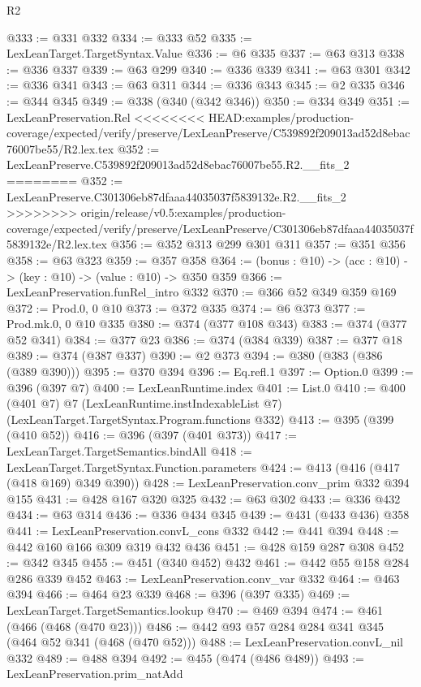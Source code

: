 \begin{lexlean}{R2}
\begin{coremodule}
{{{{{{{{{{{{{{{{{{{{{{@333 := @331 @332
@334 := @333 @52
@335 := LexLeanTarget.TargetSyntax.Value
@336 := @6 @335
@337 := @63 @313
@338 := @336 @337
@339 := @63 @299
@340 := @336 @339
@341 := @63 @301
@342 := @336 @341
@343 := @63 @311
@344 := @336 @343
@345 := @2 @335
@346 := @344 @345
@349 := @338 (@340 (@342 @346))
@350 := @334 @349
@351 := LexLeanPreservation.Rel
<<<<<<<< HEAD:examples/production-coverage/expected/verify/preserve/LexLeanPreserve/C539892f209013ad52d8ebac76007be55/R2.lex.tex
@352 := LexLeanPreserve.C539892f209013ad52d8ebac76007be55.R2.__fits_2
========
@352 := LexLeanPreserve.C301306eb87dfaaa44035037f5839132e.R2.__fits_2
>>>>>>>> origin/release/v0.5:examples/production-coverage/expected/verify/preserve/LexLeanPreserve/C301306eb87dfaaa44035037f5839132e/R2.lex.tex
@356 := @352 @313 @299 @301 @311
@357 := @351 @356
@358 := @63 @323
@359 := @357 @358
@364 := (bonus : @10) -> (acc : @10) -> (key : @10) -> (value : @10) -> @350 @359
@366 := LexLeanPreservation.funRel_intro @332
@370 := @366 @52 @349 @359 @169
@372 := Prod.{0, 0} @10
@373 := @372 @335
@374 := @6 @373
@377 := Prod.mk.{0, 0} @10 @335
@380 := @374 (@377 @108 @343)
@383 := @374 (@377 @52 @341)
@384 := @377 @23
@386 := @374 (@384 @339)
@387 := @377 @18
@389 := @374 (@387 @337)
@390 := @2 @373
@394 := @380 (@383 (@386 (@389 @390)))
@395 := @370 @394
@396 := Eq.refl.{1}
@397 := Option.{0}
@399 := @396 (@397 @7)
@400 := LexLeanRuntime.index
@401 := List.{0}
@410 := @400
    (@401 @7)
    @7
    (LexLeanRuntime.instIndexableList @7)
    (LexLeanTarget.TargetSyntax.Program.functions @332)
@413 := @395 (@399 (@410 @52))
@416 := @396 (@397 (@401 @373))
@417 := LexLeanTarget.TargetSemantics.bindAll
@418 := LexLeanTarget.TargetSyntax.Function.parameters
@424 := @413 (@416 (@417 (@418 @169) @349 @390))
@428 := LexLeanPreservation.conv_prim @332 @394 @155
@431 := @428 @167 @320 @325
@432 := @63 @302
@433 := @336 @432
@434 := @63 @314
@436 := @336 @434 @345
@439 := @431 (@433 @436) @358
@441 := LexLeanPreservation.convL_cons @332
@442 := @441 @394
@448 := @442 @160 @166 @309 @319 @432 @436
@451 := @428 @159 @287 @308
@452 := @342 @345
@455 := @451 (@340 @452) @432
@461 := @442 @55 @158 @284 @286 @339 @452
@463 := LexLeanPreservation.conv_var @332
@464 := @463 @394
@466 := @464 @23 @339
@468 := @396 (@397 @335)
@469 := LexLeanTarget.TargetSemantics.lookup
@470 := @469 @394
@474 := @461 (@466 (@468 (@470 @23)))
@486 := @442 @93 @57 @284 @284 @341 @345 (@464 @52 @341 (@468 (@470 @52)))
@488 := LexLeanPreservation.convL_nil @332
@489 := @488 @394
@492 := @455 (@474 (@486 @489))
@493 := LexLeanPreservation.prim_natAdd
}}}}}}}}}}}}}}}}}}}}}}
\end{coremodule}
\end{lexlean}
